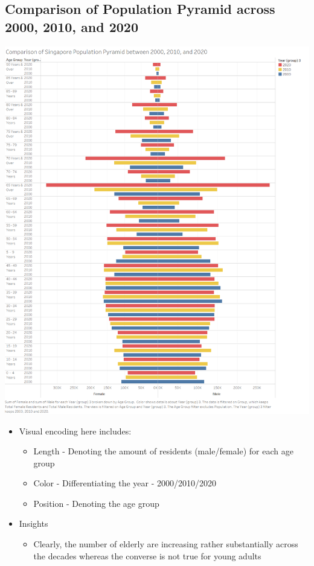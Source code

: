 \documentclass[a4paper, 11pt]{article}
\begin{document}
\subsection{Comparison of Population Pyramid across 2000, 2010, and 2020}
\label{sec:org184417f}

\begin{center}
\includegraphics[width=.9\linewidth]{./charts/Pyramid.png}
\end{center}

\begin{itemize}
\item Visual encoding here includes:
\begin{itemize}
\item Length - Denoting the amount of residents (male/female) for each age group
\item Color - Differentiating the year - 2000/2010/2020
\item Position - Denoting the age group
\end{itemize}
\item Insights
\begin{itemize}
\item Clearly, the number of elderly are increasing rather substantially across the decades whereas the converse is not true for young adults
\end{itemize}
\end{itemize}
\end{document}
